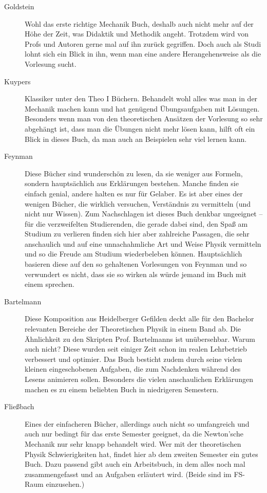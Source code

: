 \begin{description}

\item[Goldstein]{
Wohl das erste richtige Mechanik Buch, deshalb auch nicht mehr auf der
Höhe der Zeit,
was Didaktik und Methodik angeht. Trotzdem wird von Profs und Autoren
gerne mal auf ihn zurück gegriffen. Doch auch als Studi lohnt sich ein Blick
in ihn, wenn man eine andere Herangehensweise als die Vorlesung sucht.}

\item[Kuypers]{
Klassiker unter den Theo I Büchern. Behandelt wohl alles was man in
der Mechanik machen kann und hat genügend Übungsaufgaben mit Lösungen.
Besonders wenn man von den theoretischen Ansätzen der Vorlesung so sehr
abgehängt ist, dass man die Übungen nicht mehr lösen kann, hilft oft
ein Blick in dieses Buch, da man auch an Beispielen sehr viel lernen kann.}

\item[Feynman]{
Diese Bücher sind wunderschön zu lesen, da sie weniger aus Formeln,
sondern
hauptsächlich aus Erklärungen bestehen. Manche finden sie einfach
genial,
andere halten es nur für Gelaber. Es ist aber eines der wenigen Bücher, die
wirklich versuchen,
Verständnis zu vermitteln (und nicht nur Wissen). Zum Nachschlagen
ist dieses Buch
denkbar ungeeignet -- für die verzweifelten Studierenden, die gerade dabei
sind, den Spaß
am Studium zu verlieren finden sich hier aber zahlreiche Passagen, die
sehr anschaulich
und auf eine unnachahmliche Art und Weise Physik vermitteln und so die
Freude am
Studium wiederbeleben können. Hauptsächlich basieren diese auf den so 
gehaltenen Vorlesungen von Feynman und so verwundert es nicht, dass 
sie so wirken als würde jemand im Buch mit einem sprechen.}

\item[Bartelmann]{Diese Komposition aus Heidelberger Gefilden deckt
alle für den Bachelor relevanten Bereiche der Theoretischen Physik in
einem Band ab. Die Ähnlichkeit zu den Skripten Prof. Bartelmanns ist
unübersehbar. Warum auch nicht? Diese wurden seit einiger Zeit schon
im realen Lehrbetrieb verbessert und optimier. Das Buch besticht zudem
durch seine vielen kleinen eingeschobenen Aufgaben, die zum Nachdenken
während des Lesens animieren sollen. Besonders die vielen anschaulichen
Erklärungen machen es zu einem beliebten Buch in niedrigeren Semestern.}


\item[Fließbach]{
Eines der einfacheren Bücher, allerdings auch nicht so umfangreich
und auch nur bedingt für das erste Semester geeignet, da die Newton'sche Mechanik
nur sehr knapp behandelt wird. Wer mit der theoretischen Physik 
Schwierigkeiten hat, findet hier ab dem zweiten Semester ein gutes Buch.
Dazu passend gibt auch ein Arbeitsbuch, in dem alles noch mal zusammengefasst
und an Aufgaben erläutert wird. (Beide sind im FS-Raum einzusehen.)}


\end{description}
